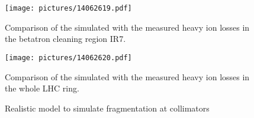   \begin{figure}[t]
  \centering
  \texttt{[image: pictures/14062619.pdf]}
  \caption{Comparison of the simulated with the measured heavy ion losses in the betatron cleaning region IR7.}  
  \label{pic:14062610}
  \end{figure}



  \begin{figure}[t]
  \centering
  \texttt{[image: pictures/14062620.pdf]}
  \caption{Comparison of the simulated with the measured heavy ion losses in the whole LHC ring.}  
  \label{pic:14062610}
  \end{figure}


\begin{figure}[htb]
  \centering
   \def\svgwidth{1.0\linewidth}
   
  \caption{Realistic model to simulate fragmentation at collimators }
  \label{pic:14062604}
\end{figure}

